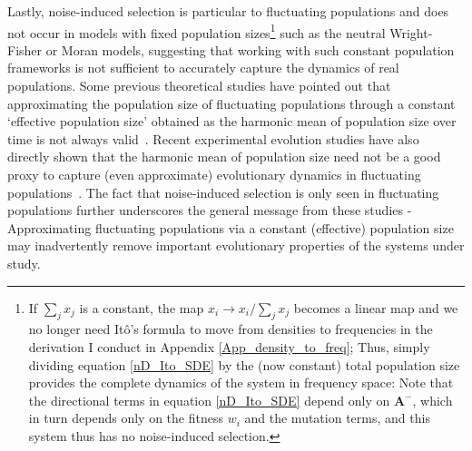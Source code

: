 Lastly, noise-induced selection is particular to fluctuating populations and does not occur in models with fixed population sizes\footnote{If $\sum_j x_j$ is a constant, the map $x_i \to x_i/\sum_j x_j$ becomes a linear map and we no longer need It\^o's formula to move from densities to frequencies in the derivation I conduct in Appendix \ref{App_density_to_freq}; Thus, simply dividing equation \eqref{nD_Ito_SDE} by the (now constant) total population size provides the complete dynamics of the system in frequency space: Note that the directional terms in equation \eqref{nD_Ito_SDE} depend only on $\mathbf{A}^-$, which in turn depends only on the fitness $w_i$ and the mutation terms, and this system thus has no noise-induced selection.} such as the neutral Wright-Fisher or Moran models, suggesting that working with such constant population frameworks is not sufficient to accurately capture the dynamics of real populations. Some previous theoretical studies have pointed out that approximating the population size of fluctuating populations through a constant `effective population size' obtained as the harmonic mean of population size over time is not always valid~\citep{sjodin_meaning_2005,parsons_consequences_2010,iizuka_effective_2010,abu_awad_effects_2018,kuosmanen_turnover_2022}. Recent experimental evolution studies have also directly shown that the harmonic mean of population size need not be a good proxy to capture (even approximate) evolutionary dynamics in fluctuating populations~\citep{chavhan_larger_2019}. The fact that noise-induced selection is only seen in fluctuating populations further underscores the general message from these studies - Approximating fluctuating populations via a constant (effective) population size may inadvertently remove important evolutionary properties of the systems under study.

